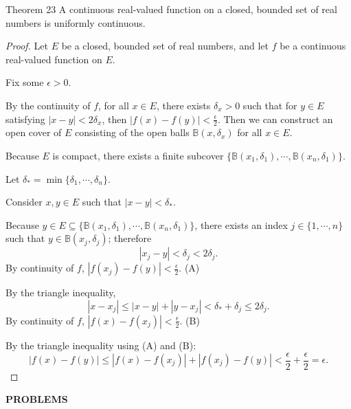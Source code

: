 \begin{flushleft}
\begin{namedthm*}{Theorem 23}
	A continuous real-valued function on a closed, bounded set of real numbers is uniformly continuous.
\end{namedthm*}
\begin{proof}
	Let $E$ be a closed, bounded set of real numbers, and let $f$ be a continuous real-valued function on $E$.\par
	Fix some $\epsilon>0$.\par
	By the continuity of $f$, for all $x\in E$, there exists $\delta_x>0$ such that for $y\in E$ satisfying $|x-y|< 2\delta_x$, then $|f(x)-f(y)|< \frac{\epsilon}{2}$.
	Then we can construct an open cover of $E$ consisting of the open balls $\mathbb{B}(x,\delta_x)$ for all $x \in E$.\par
	Because $E$ is compact, there exists a finite subcover $\{\mathbb{B}(x_1,\delta_1),\cdots,\mathbb{B}(x_n,\delta_1)\}$.\par
	Let $\delta_* = \min\{\delta_1,\cdots,\delta_n\}$.\par
	Consider $x,y\in E$ such that $|x-y|<\delta_*$.\par
	Because $y \in E \subseteq \{\mathbb{B}(x_1,\delta_1),\cdots,\mathbb{B}(x_n,\delta_1)\}$, there exists an index $j\in \{1,\cdots,n\}$ such that $y \in \mathbb{B}(x_j,\delta_j)$; therefore
	\[
		|x_j-y|<\delta_j <2\delta_j.
	\]
	By continuity of $f$, $|f(x_j)-f(y)|<\frac{\epsilon}{2}$. (A)\par
	By the triangle inequality,
	\[
		|x-x_j|\le |x-y| + |y-x_j| <\delta_* + \delta_j \le 2\delta_j.
	\]
	By continuity of $f$, $|f(x)-f(x_j)|<\frac{\epsilon}{2}$. (B)\par
	By the triangle inequality using (A) and (B):
	\[
		|f(x)-f(y)| \le |f(x)-f(x_j)| +|f(x_j)-f(y)| < \frac{\epsilon}{2}+\frac{\epsilon}{2} = \epsilon.
	\]
\end{proof}

\end{flushleft}
\begin{center}
	\textbf{PROBLEMS}
\end{center}
